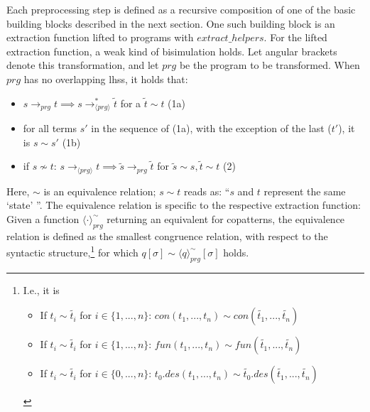 Each preprocessing step is defined as a recursive composition of one of the basic building blocks described in the next section. One such building block is an extraction function lifted to programs with $extract\_helpers$. For the lifted extraction function, a weak kind of bisimulation holds. Let angular brackets denote this transformation, and let $prg$ be the program to be transformed. When $prg$ has no overlapping lhss, it holds that:

\begin{itemize}
\item $s \longrightarrow_{prg} t \implies s  \longrightarrow^*_{\langle prg \rangle} \tilde{t}$ for a $\tilde{t} \sim t$ (1a)

\item for all terms $s'$ in the sequence of (1a), with the exception of the last ($t'$), it is $s \sim s'$ (1b)

\item if $s \not\sim t$: $s \longrightarrow_{\langle prg \rangle} t \implies \tilde{s} \longrightarrow_{prg} \tilde{t}$ for $\tilde{s} \sim s, \tilde{t} \sim t$ (2)

\end{itemize}

Here, $\sim$ is an equivalence relation; $s \sim t$ reads as: ``$s$ and $t$ represent the same `state' ''. The equivalence relation is specific to the respective extraction function: Given a function $\langle \cdot \rangle^{\sim}_{prg}$ returning an equivalent for copatterns, the equivalence relation is defined as the smallest congruence relation, with respect to the syntactic structure,\footnote{I.e., it is
\begin{itemize}

\item If $t_i \sim \widetilde{t_i}$ for $i \in \{1, ..., n\}$: $con(t_1, ..., t_n) \sim con(\widetilde{t_1}, ..., \widetilde{t_n})$

\item If $t_i \sim \widetilde{t_i}$ for $i \in \{1, ..., n\}$: $fun(t_1, ..., t_n) \sim fun(\widetilde{t_1}, ..., \widetilde{t_n})$

\item If $t_i \sim \widetilde{t_i}$ for $i \in \{0, ..., n\}$: $t_0.des(t_1, ..., t_n) \sim \widetilde{t_0}.des(\widetilde{t_1}, ..., \widetilde{t_n})$ 

\end{itemize}} for which $q[\sigma] \sim \langle q \rangle^{\sim}_{prg}[\sigma]$ holds.

